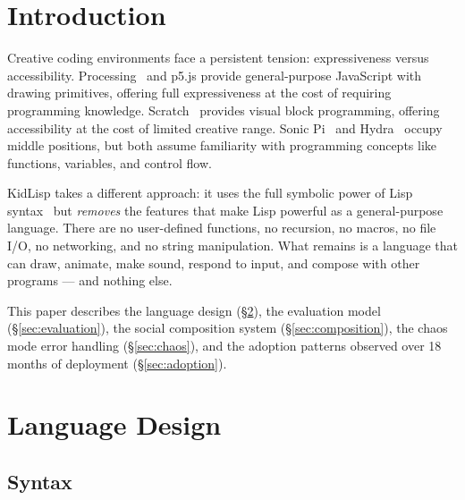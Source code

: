\documentclass[sigconf,nonacm]{acmart}
\begin{document}


\maketitle

\section{Introduction}

Creative coding environments face a persistent tension: expressiveness versus accessibility. Processing~\cite{reas2007processing} and p5.js provide general-purpose JavaScript with drawing primitives, offering full expressiveness at the cost of requiring programming knowledge. Scratch~\cite{resnick2009scratch} provides visual block programming, offering accessibility at the cost of limited creative range. Sonic Pi~\cite{aaron2016sonic} and Hydra~\cite{jack2019hydra} occupy middle positions, but both assume familiarity with programming concepts like functions, variables, and control flow.

KidLisp takes a different approach: it uses the full symbolic power of Lisp syntax~\cite{mccarthy1960recursive} but \emph{removes} the features that make Lisp powerful as a general-purpose language. There are no user-defined functions, no recursion, no macros, no file I/O, no networking, and no string manipulation. What remains is a language that can draw, animate, make sound, respond to input, and compose with other programs --- and nothing else.

This paper describes the language design (\S\ref{sec:language}), the evaluation model (\S\ref{sec:evaluation}), the social composition system (\S\ref{sec:composition}), the chaos mode error handling (\S\ref{sec:chaos}), and the adoption patterns observed over 18 months of deployment (\S\ref{sec:adoption}).

\section{Language Design}
\label{sec:language}

\subsection{Syntax}
\end{document}
